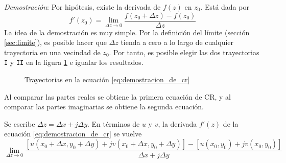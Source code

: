 \textit{Demostración}: Por hipótesis, existe la derivada de $f(z)$ en $z_0$. Está dada por
\begin{equation}\label{eq:demostracion_de_cr}
  f'(z_0)=\lim_{\Delta z \to 0} \frac{f(z_0+\Delta z)-f(z_0)}{\Delta z}
\end{equation}
La idea de la demostración es muy simple. Por la definición del límite (sección \ref{sec:limite}), es posible hacer que $\Delta z$ tienda a cero a lo largo de cualquier trayectoria en una vecindad de $z_0$. Por tanto, es posible elegir las dos trayectorias \texttt{I} y \texttt{II} en la figura \ref{fig:trayectorias_de_demostracion_de_cr} e igualar los resultados.
\begin{figure}[ht]
  \centering
  \caption{Trayectorias en la ecuación \ref{eq:demostracion_de_cr}}
  \label{fig:trayectorias_de_demostracion_de_cr}
\end{figure}
Al comparar las partes reales se obtiene la primera ecuación de CR, y al comparar las partes imaginarias se obtiene la segunda ecuación.

Se escribe $\Delta z = \Delta x + j \Delta y$. En términos de $u$ y $v$, la derivada $f'(z)$ de la ecuación \ref{eq:demostracion_de_cr} se vuelve
\begin{equation*}
  \lim_{\Delta z \to 0} 
    \frac
      {\left[ 
        u(x_0+\Delta x, y_0+\Delta y) + jv(x_0+\Delta x, y_0 +\Delta y) 
      \right] - \left[
        u(x_0,y_0) + jv(x_0,y_0)
      \right]}
      {\Delta x + j\Delta y}
\end{equation*}

